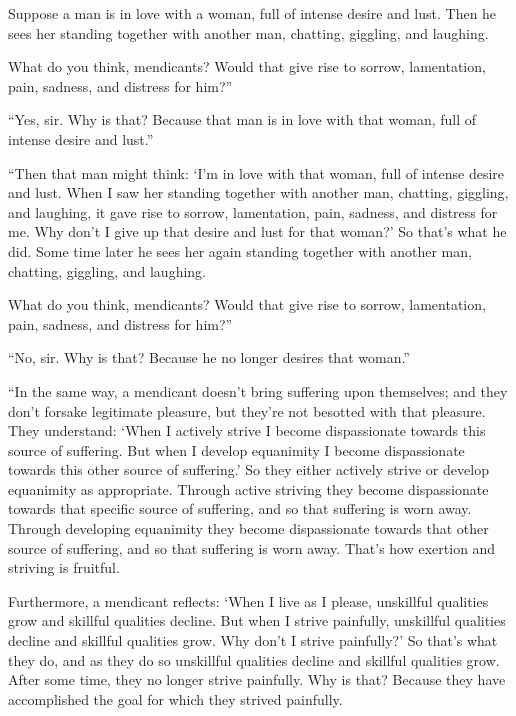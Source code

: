 \documentclass[12pt,openany]{book}%
\begin{document}
Suppose a man is in love with a woman, full of intense desire and lust. Then he sees her standing together with another man, chatting, giggling, and laughing. 

What do you think, mendicants? Would that give rise to sorrow, lamentation, pain, sadness, and distress for him?” 

“Yes, sir. Why is that? Because that man is in love with that woman, full of intense desire and lust.” 

“Then that man might think: ‘I’m in love with that woman, full of intense desire and lust. When I saw her standing together with another man, chatting, giggling, and laughing, it gave rise to sorrow, lamentation, pain, sadness, and distress for me. Why don’t I give up that desire and lust for that woman?’ So that’s what he did. Some time later he sees her again standing together with another man, chatting, giggling, and laughing. 

What do you think, mendicants? Would that give rise to sorrow, lamentation, pain, sadness, and distress for him?” 

“No, sir. Why is that? Because he no longer desires that woman.” 

“In the same way, a mendicant doesn’t bring suffering upon themselves; and they don’t forsake legitimate pleasure, but they’re not besotted with that pleasure. They understand: ‘When I actively strive I become dispassionate towards this source of suffering. But when I develop equanimity I become dispassionate towards this other source of suffering.’ So they either actively strive or develop equanimity as appropriate. Through active striving they become dispassionate towards that specific source of suffering, and so that suffering is worn away. Through developing equanimity they become dispassionate towards that other source of suffering, and so that suffering is worn away. That’s how exertion and striving is fruitful. 

Furthermore, a mendicant reflects: ‘When I live as I please, unskillful qualities grow and skillful qualities decline. But when I strive painfully, unskillful qualities decline and skillful qualities grow. Why don’t I strive painfully?’ So that’s what they do, and as they do so unskillful qualities decline and skillful qualities grow. After some time, they no longer strive painfully. Why is that? Because they have accomplished the goal for which they strived painfully. 
\end{document}

